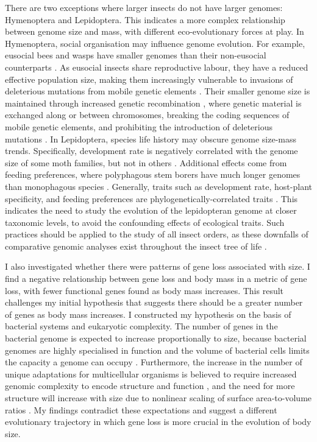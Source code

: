\documentclass[11pt]{article}
\begin{document}
There are two exceptions where larger insects do not have larger genomes: Hymenoptera and Lepidoptera. This indicates a more complex relationship between genome size and mass, with different eco-evolutionary forces at play. In Hymenoptera, social organisation may influence genome evolution. For example, eusocial bees and wasps have smaller genomes than their non-eusocial counterparts \citep{termite-eusociality, shrimp-eusociality}. As eusocial insects share reproductive labour, they have a reduced effective population size, making them increasingly vulnerable to invasions of deleterious mutations from mobile genetic elements \citep{eusociality-Ne}. Their smaller genome size is maintained through increased genetic recombination \citep{eusociality-recombination}, where genetic material is exchanged along or between chromosomes, breaking the coding sequences of mobile genetic elements, and prohibiting the introduction of deleterious mutations \citep{hymen-recomb-1, hymen-recomb-2}. In Lepidoptera, species life history may obscure genome size-mass trends. Specifically, development rate is negatively correlated with the genome size of some moth families, but not in others \citep{lep-genomes2}. Additional effects come from feeding preferences, where polyphagous stem borers have much longer genomes than monophagous species \citep{polyphagous-leps}. Generally, traits such as development rate, host-plant specificity, and feeding preferences are phylogenetically-correlated traits \citep{leps-phylogeny}. This indicates the need to study the evolution of the lepidopteran genome at closer taxonomic levels, to avoid the confounding effects of ecological traits. Such practices should be applied to the study of all insect orders, as these downfalls of comparative genomic analyses exist throughout the insect tree of life \citep{arthropod-gs-phylogeny}. 

I also investigated whether there were patterns of gene loss associated with size. I find a negative relationship between gene loss and body mass in a metric of gene loss, with fewer functional genes found as body mass increases. This result challenges my initial hypothesis that suggests there should be a greater number of genes as body mass increases. I constructed my hypothesis on the basis of bacterial systems and eukaryotic complexity. The number of genes in the bacterial genome is expected to increase proportionally to size, because bacterial genomes are highly specialised in function and the volume of bacterial cells limits the capacity a genome can occupy \citep{DeLong}. Furthermore, the increase in the number of unique adaptations for multicellular organisms is believed to require increased genomic complexity to encode structure and function \citep{genomecomplexity, bingham}, and the need for more structure will increase with size due to nonlinear scaling of surface area-to-volume ratios \citep{ruppert1983morphology, system-scaling}. My findings contradict these expectations and suggest a different evolutionary trajectory in which gene loss is more crucial in the evolution of body size. 
\end{document}
